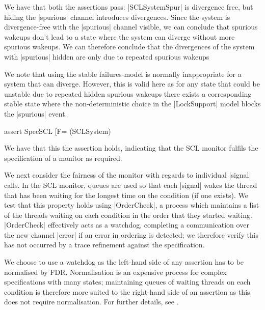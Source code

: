 We have that both the assertions pass: |SCLSystemSpur| is divergence free, but hiding the |spurious| channel introduces divergences. Since the system is divergence-free with the |spurious| channel visible, we can conclude that spurious wakeups don't lead to a state where the system can diverge without more spurious wakeups. We can therefore conclude that the divergences of the system with |spurious| hidden are only due to repeated spurious wakeups


We note that using the stable failures-model is normally inappropriate for a system that can diverge. However, this is valid here as for any state that could be unstable due to repeated hidden spurious wakeups there exists a corresponding stable state where the non-deterministic choice in the |LockSupport| model blocks the |spurious| event. 

\begin{cspm}
  assert SpecSCL [F= (SCLSystem) 
\end{cspm}

We have that this the assertion holds, indicating that the SCL monitor fulfils the specification of a monitor as required.

We next consider the fairness of the monitor with regards to individual |signal| calls. In the SCL monitor, queues are used so that each |signal| wakes the thread that has been waiting for the longest time on the condition (if one exists). We test that this property holds using |OrderCheck|, a process which maintains a list of the threads waiting on each condition in the order that they started waiting. |OrderCheck| effectively acts as a watchdog, completing a communication over the new channel |error| if an error in ordering is detected; we therefore verify this has not occurred by a trace refinement against the specification. 

We choose to use a watchdog as the left-hand side of any assertion has to be normalised by FDR. Normalisation is an expensive process for complex specifications with many states; maintaining queues of waiting threads on each condition is therefore more suited to the right-hand side of an assertion as this does not require normalisation. For further details, see \cite{RoscoeUCS}.

